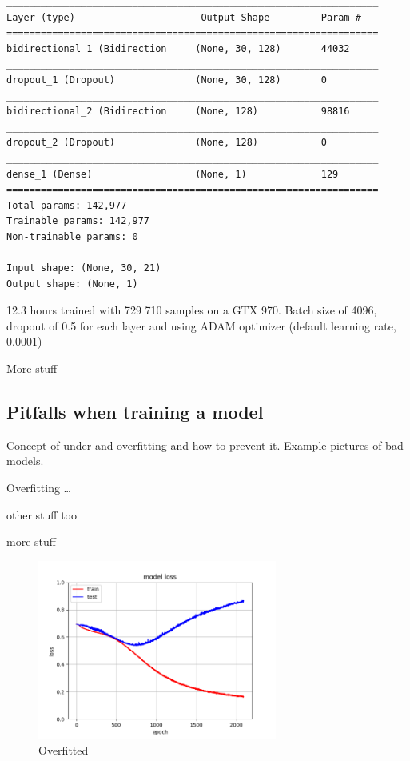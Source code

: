 \begin{lstlisting}
_________________________________________________________________
Layer (type)                      Output Shape         Param #   
=================================================================
bidirectional_1 (Bidirection     (None, 30, 128)       44032     
_________________________________________________________________
dropout_1 (Dropout)              (None, 30, 128)       0         
_________________________________________________________________
bidirectional_2 (Bidirection     (None, 128)           98816     
_________________________________________________________________
dropout_2 (Dropout)              (None, 128)           0         
_________________________________________________________________
dense_1 (Dense)                  (None, 1)             129       
=================================================================
Total params: 142,977
Trainable params: 142,977
Non-trainable params: 0
_________________________________________________________________
Input shape: (None, 30, 21)
Output shape: (None, 1)

\end{lstlisting}

12.3 hours trained with 729 710 samples on a GTX 970.
Batch size of 4096, dropout of 0.5 for each layer and using ADAM optimizer (default learning rate, 0.0001)

More stuff
\newline  %


\subsection{Pitfalls when training a model}
Concept of under and overfitting and how to prevent it. Example pictures of bad models.

Overfitting \dots

other stuff too

more stuff

\begin{figure}[H] %
\center
\includegraphics[width=0.7\textwidth]{pictures/overfit.png}
\caption{\label{fig:overfit}Overfitted}
\end{figure}


